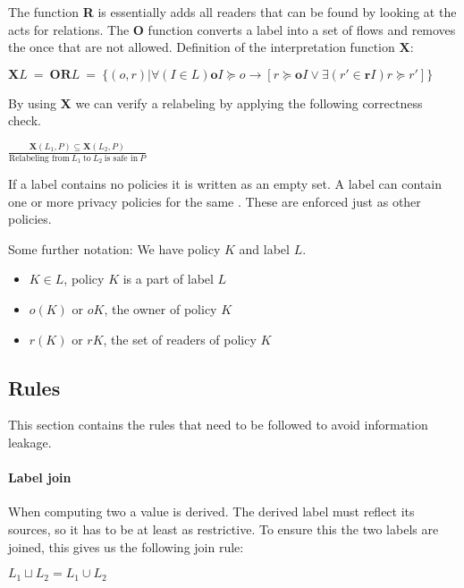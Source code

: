 The function \textbf{R} is essentially adds all readers that can be found by looking at the acts for relations.
The \textbf{O} function converts a label into a set of flows and removes the once that are not allowed.
Definition of the interpretation function $\textbf{X}$:
\begin{center}
  $\textbf{X}L \ = \ \textbf{OR}L \ = \ \{(o,r)|\forall (I \in L) \textbf{o}I \succeq o \rightarrow [r \succeq \textbf{o}I \vee \exists (r' \in \textbf{r}I) r \succeq r'] \}$
\end{center}

By using \textbf{X} we can verify a relabeling by applying the following correctness check.
\begin{center}
  $\frac{\textbf{X}(L_1, P)\subseteq \textbf{X}(L_2,P)}{\mbox{Relabeling from} \ L_1 \ \mbox{to} \ L_2 \ \mbox{is safe in} \ P }$
\end{center}

If a label contains no policies it is written as an empty set.
A label can contain one or more privacy policies for the same \principal{}.
These are enforced just as other policies.

Some further notation:
We have policy $K$ and label $L$.
\begin{itemize}
\item $K \in L$, policy $K$ is a part of label $L$
\item $o(K)$ or $oK$, the owner of policy $K$
\item $r(K)$ or $rK$, the set of readers of policy $K$
\end{itemize}

\subsection{Rules}
This section contains the rules that need to be followed to avoid information leakage.

\paragraph{Label join}
When computing two \xvalues{} a value is derived.
The derived \xvalues{} label must reflect its sources, so it has to be at least as restrictive.
To ensure this the two labels are joined, this gives us the following join rule:
\begin{center}
  $L_1 \sqcup L_2 = L_1 \cup L_2$
\end{center}

